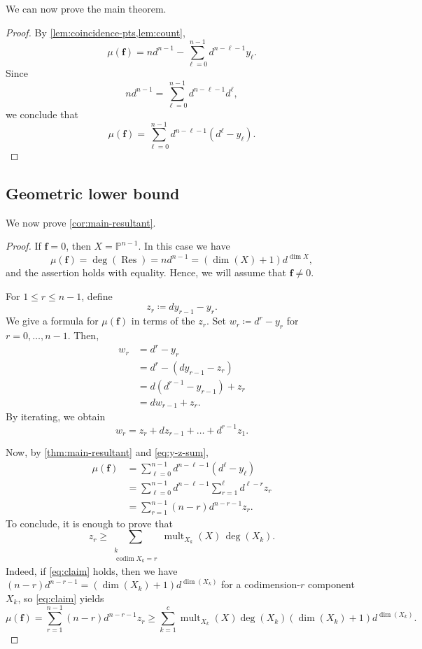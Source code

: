 \documentclass[11pt,letterpaper]{article}
\numberwithin{equation}{section}
\newcommand{\PP}{\mathbb{P}}
\newcommand{\ff}{\ensuremath{\boldsymbol{f}}}
\DeclareMathOperator{\codim}{codim}
\DeclareMathOperator{\Res}{Res}
\DeclareMathOperator{\mult}{mult}
\begin{document}
We can now prove the main theorem. 

\resultant*
\begin{proof}
    By \cref{lem:coincidence-pts,lem:count}, \[
    \mu(\ff) = nd^{n-1}-\sum_{\ell=0}^{n-1} d^{n-\ell-1}y_\ell.
    \] Since \[
    nd^{n-1} = \sum_{\ell=0}^{n-1} d^{n-\ell-1} d^{\ell},
    \] we conclude that \[
    \mu(\ff) = \sum_{\ell=0}^{n-1} d^{n-\ell-1} (d^\ell - y_\ell).
    \] 
\end{proof}

\subsection{Geometric lower bound}

We now prove \cref{cor:main-resultant}.

\lowerbound*
\begin{proof}
If $\ff=0$, then $X=\PP^{n-1}$.
In this case we have \[
\mu(\ff)=\deg(\Res)=n d^{n-1} = (\dim(X)+1)d^{\dim X},
\] and the assertion holds with equality.
Hence, we will assume that $\ff\neq 0$.

    For $1\leq r\leq n-1$, define \[
    z_r \coloneqq d y_{r-1} - y_r.
    \] 
    We give a formula for $\mu(\ff)$ in terms of the $z_r$.
    Set $w_r\coloneqq d^r-y_r$ for $r=0,\dots,n-1$.
    Then, \[
    \begin{split}
    w_r &= d^{r}-y_r\\ &= d^r- (d y_{r-1}-z_r)\\
    &= d(d^{r-1}-y_{r-1})+z_r\\
    &= d w_{r-1} + z_r.
    \end{split}
    \] 
    By iterating, we obtain \begin{equation}
    \label{eq:y-z-sum}
    w_r = z_r + d z_{r-1} + \dots + d^{r-1} z_1.
    \end{equation}

    Now, by \cref{thm:main-resultant} and \cref{eq:y-z-sum}, \[
    \begin{split}
        \mu(\ff) &= \sum_{\ell=0}^{n-1} d^{n-\ell-1} \left(d^{\ell}-y_\ell\right)\\
        &=\sum_{\ell=0}^{n-1}d^{n-\ell-1}\sum_{r=1}^{\ell} d^{\ell-r}z_r\\
        &=\sum_{r=1}^{n-1} (n-r) d^{n-r-1} z_r.
    \end{split}
    \]
     To conclude, it is enough to prove that \begin{equation}
        \label{eq:claim}
        z_r \geq \sum_{\substack{k\\ \codim X_k=r}} \mult_{X_k}(X)\,\deg (X_k).
    \end{equation}
    Indeed, if \cref{eq:claim} holds, then we have $(n-r)d^{n-r-1}=(\dim(X_k)+1)d^{\dim(X_k)}$ for a codimension-$r$ component $X_k$, so \cref{eq:claim} yields \[
    \mu(\ff) = \sum_{r=1}^{n-1} (n-r) d^{n-r-1} z_r \geq \sum_{k=1}^c \mult_{X_k}(X)\deg(X_k)(\dim(X_k)+1) d^{\dim(X_k)}.
    \] 


\end{proof}
\end{document}
